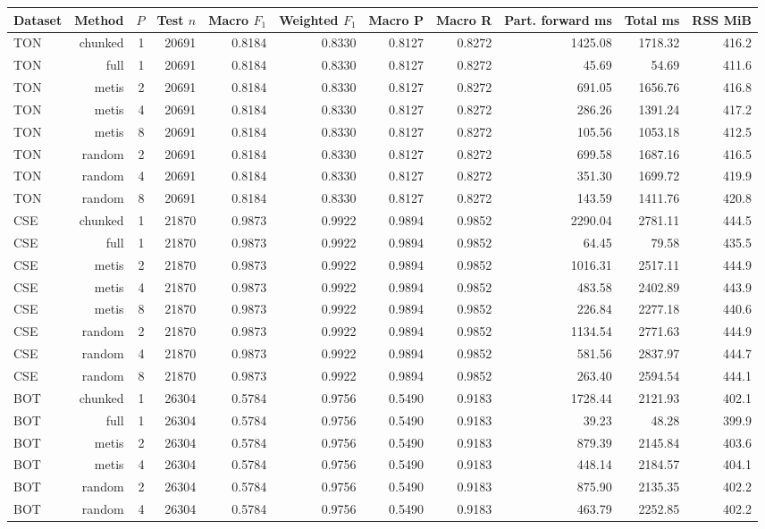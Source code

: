 \begin{tabular}{lrrrrrrrrrr}
\toprule
Dataset & Method & $P$ & Test $n$ & Macro $F_1$ & Weighted $F_1$ & Macro P & Macro R & Part. forward ms & Total ms & RSS MiB \\
\midrule
TON & chunked & 1 & 20691 & 0.8184 & 0.8330 & 0.8127 & 0.8272 & 1425.08 & 1718.32 & 416.2 \\
TON & full & 1 & 20691 & 0.8184 & 0.8330 & 0.8127 & 0.8272 & 45.69 & 54.69 & 411.6 \\
TON & metis & 2 & 20691 & 0.8184 & 0.8330 & 0.8127 & 0.8272 & 691.05 & 1656.76 & 416.8 \\
TON & metis & 4 & 20691 & 0.8184 & 0.8330 & 0.8127 & 0.8272 & 286.26 & 1391.24 & 417.2 \\
TON & metis & 8 & 20691 & 0.8184 & 0.8330 & 0.8127 & 0.8272 & 105.56 & 1053.18 & 412.5 \\
TON & random & 2 & 20691 & 0.8184 & 0.8330 & 0.8127 & 0.8272 & 699.58 & 1687.16 & 416.5 \\
TON & random & 4 & 20691 & 0.8184 & 0.8330 & 0.8127 & 0.8272 & 351.30 & 1699.72 & 419.9 \\
TON & random & 8 & 20691 & 0.8184 & 0.8330 & 0.8127 & 0.8272 & 143.59 & 1411.76 & 420.8 \\
CSE & chunked & 1 & 21870 & 0.9873 & 0.9922 & 0.9894 & 0.9852 & 2290.04 & 2781.11 & 444.5 \\
CSE & full & 1 & 21870 & 0.9873 & 0.9922 & 0.9894 & 0.9852 & 64.45 & 79.58 & 435.5 \\
CSE & metis & 2 & 21870 & 0.9873 & 0.9922 & 0.9894 & 0.9852 & 1016.31 & 2517.11 & 444.9 \\
CSE & metis & 4 & 21870 & 0.9873 & 0.9922 & 0.9894 & 0.9852 & 483.58 & 2402.89 & 443.9 \\
CSE & metis & 8 & 21870 & 0.9873 & 0.9922 & 0.9894 & 0.9852 & 226.84 & 2277.18 & 440.6 \\
CSE & random & 2 & 21870 & 0.9873 & 0.9922 & 0.9894 & 0.9852 & 1134.54 & 2771.63 & 444.9 \\
CSE & random & 4 & 21870 & 0.9873 & 0.9922 & 0.9894 & 0.9852 & 581.56 & 2837.97 & 444.7 \\
CSE & random & 8 & 21870 & 0.9873 & 0.9922 & 0.9894 & 0.9852 & 263.40 & 2594.54 & 444.1 \\
BOT & chunked & 1 & 26304 & 0.5784 & 0.9756 & 0.5490 & 0.9183 & 1728.44 & 2121.93 & 402.1 \\
BOT & full & 1 & 26304 & 0.5784 & 0.9756 & 0.5490 & 0.9183 & 39.23 & 48.28 & 399.9 \\
BOT & metis & 2 & 26304 & 0.5784 & 0.9756 & 0.5490 & 0.9183 & 879.39 & 2145.84 & 403.6 \\
BOT & metis & 4 & 26304 & 0.5784 & 0.9756 & 0.5490 & 0.9183 & 448.14 & 2184.57 & 404.1 \\
BOT & random & 2 & 26304 & 0.5784 & 0.9756 & 0.5490 & 0.9183 & 875.90 & 2135.35 & 402.2 \\
BOT & random & 4 & 26304 & 0.5784 & 0.9756 & 0.5490 & 0.9183 & 463.79 & 2252.85 & 402.2 \\
\bottomrule
\end{tabular}
